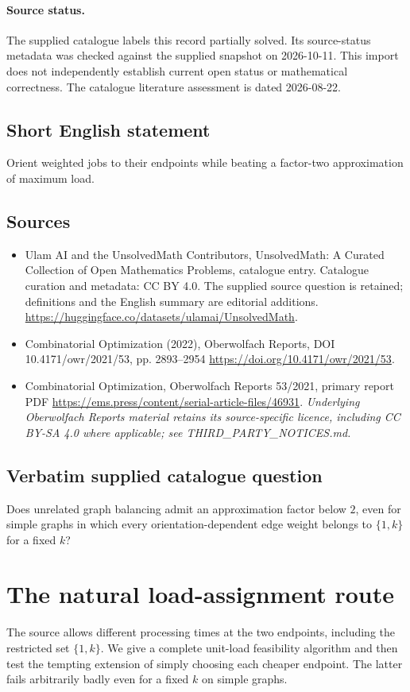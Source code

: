 \documentclass[11pt]{article}
\begin{document}
\paragraph{Source status.}
The supplied catalogue labels this record partially solved. Its source-status metadata was checked against the supplied snapshot on 2026-10-11. This import does not independently establish current open status or mathematical correctness. The catalogue literature assessment is dated 2026-08-22.
\subsection{Short English statement}
Orient weighted jobs to their endpoints while beating a factor-two approximation of maximum load.
\subsection{Sources}
\begin{itemize}
\item[S1] Ulam AI and the UnsolvedMath Contributors, UnsolvedMath: A Curated Collection of Open Mathematics Problems, catalogue entry. Catalogue curation and metadata: CC BY 4.0. The supplied source question is retained; definitions and the English summary are editorial additions.
\url{https://huggingface.co/datasets/ulamai/UnsolvedMath}.
\item[S2] Combinatorial Optimization (2022), Oberwolfach Reports, DOI 10.4171/owr/2021/53, pp. 2893--2954
\url{https://doi.org/10.4171/owr/2021/53}.
\item[S3] Combinatorial Optimization, Oberwolfach Reports 53/2021, primary report PDF
\url{https://ems.press/content/serial-article-files/46931}.
\textit{Underlying Oberwolfach Reports material retains its source-specific licence, including CC BY-SA 4.0 where applicable; see THIRD\_PARTY\_NOTICES.md.}
\end{itemize}
\subsection{Verbatim supplied catalogue question}
Does unrelated graph balancing admit an approximation factor below $2$, even for simple graphs in which every orientation-dependent edge weight belongs to $\{1,k\}$ for a fixed $k$?

\section{The natural load-assignment route}
The source allows different processing times at the two endpoints,
including the restricted set $\{1,k\}$. We give a complete
unit-load feasibility algorithm and then test the tempting extension
of simply choosing each cheaper endpoint. The latter fails arbitrarily
badly even for a fixed $k$ on simple graphs.
\end{document}

